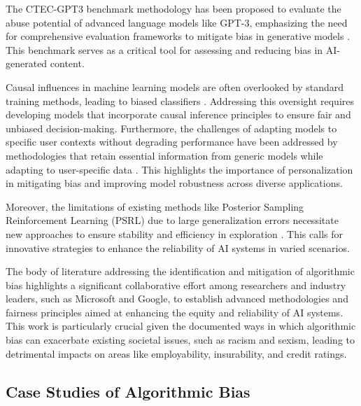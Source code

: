 The CTEC-GPT3 benchmark methodology has been proposed to evaluate the abuse potential of advanced language models like GPT-3, emphasizing the need for comprehensive evaluation frameworks to mitigate bias in generative models \cite{mcguffie2020radicalizationrisksgpt3advanced}. This benchmark serves as a critical tool for assessing and reducing bias in AI-generated content.



Causal influences in machine learning models are often overlooked by standard training methods, leading to biased classifiers \cite{sen2018supervisingfeatureinfluence}. Addressing this oversight requires developing models that incorporate causal inference principles to ensure fair and unbiased decision-making. Furthermore, the challenges of adapting models to specific user contexts without degrading performance have been addressed by methodologies that retain essential information from generic models while adapting to user-specific data \cite{kaur2024cropcontextwiserobuststatic}. This highlights the importance of personalization in mitigating bias and improving model robustness across diverse applications.



Moreover, the limitations of existing methods like Posterior Sampling Reinforcement Learning (PSRL) due to large generalization errors necessitate new approaches to ensure stability and efficiency in exploration \cite{zhang2022conservativedualpolicyoptimization}. This calls for innovative strategies to enhance the reliability of AI systems in varied scenarios.



The body of literature addressing the identification and mitigation of algorithmic bias highlights a significant collaborative effort among researchers and industry leaders, such as Microsoft and Google, to establish advanced methodologies and fairness principles aimed at enhancing the equity and reliability of AI systems. This work is particularly crucial given the documented ways in which algorithmic bias can exacerbate existing societal issues, such as racism and sexism, leading to detrimental impacts on areas like employability, insurability, and credit ratings. \cite{magee2021intersectionalbiascausallanguage}



\subsection{Case Studies of Algorithmic Bias} \label{subsec:Case Studies of Algorithmic Bias}



